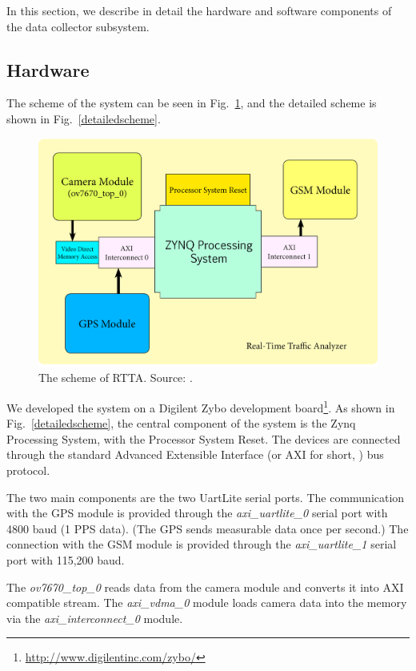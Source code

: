 \documentclass[b5paper,12pt]{report}
\theoremstyle{definition}
\begin{document}
In this section, we describe in detail the hardware and software components of the data collector subsystem.

\subsection{Hardware}
\label{rttahw}

The scheme of the system can be seen in Fig.~\ref{rttaschema}, and the detailed scheme is shown in Fig.~\ref{detailedscheme}.

\begin{figure}[ht]
\centerline{
\includegraphics[width=12cm]{img/sema.png}}
\caption{The scheme of RTTA. Source: \cite{usingcoginfocom}.}
\label{rttaschema}
\end{figure}  

We developed the system on a Digilent Zybo development board\footnote{\url{http://www.digilentinc.com/zybo/}}. As shown in Fig.~\ref{detailedscheme}, the central component of the system is the Zynq Processing System, with the Processor System Reset. The devices are connected through the standard Advanced Extensible Interface (or AXI for short, \cite{xilinx1999reference}) bus protocol. 

The two main components are the two UartLite serial ports. The communication with the GPS module is provided through the \emph{axi\_uartlite\_0} serial port with 4800 baud (1 PPS data). (The GPS sends measurable data once per second.) The connection with the GSM module is provided through the \emph{axi\_uartlite\_1} serial port with 115,200 baud. 

The \emph{ov7670\_top\_0} reads data from the camera module and converts it into AXI compatible stream. The \emph{axi\_vdma\_0} module loads camera data into the memory via the \emph{axi\_interconnect\_0} module. 
\end{document}
